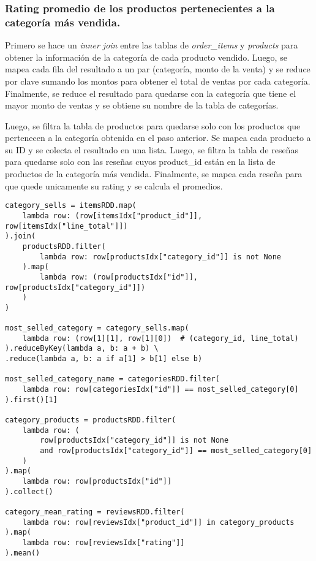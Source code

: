 \subsubsection{Rating promedio de los productos pertenecientes a la categoría más vendida.}

Primero se hace un \textit{inner join} entre las tablas de \textit{order\_items} y \textit{products} para obtener la información de la categoría de cada producto vendido. Luego, se mapea cada fila del resultado a un par (categoría, monto de la venta) y se reduce por clave sumando los montos para obtener el total de ventas por cada categoría. Finalmente, se reduce el resultado para quedarse con la categoría que tiene el mayor monto de ventas y se obtiene su nombre de la tabla de categorías.

Luego, se filtra la tabla de productos para quedarse solo con los productos que pertenecen a la categoría obtenida en el paso anterior. Se mapea cada producto a su ID y se colecta el resultado en una lista. Luego, se filtra la tabla de reseñas para quedarse solo con las reseñas cuyos product\_id están en la lista de productos de la categoría más vendida. Finalmente, se mapea cada reseña para que quede unicamente su rating y se calcula el promedios.



\begin{lstlisting}[caption={Resolución de la consulta 4 propuesta propia.}, xleftmargin=20pt, xrightmargin=20pt]
category_sells = itemsRDD.map(
    lambda row: (row[itemsIdx["product_id"]], row[itemsIdx["line_total"]])
).join(
    productsRDD.filter(
        lambda row: row[productsIdx["category_id"]] is not None
    ).map(
        lambda row: (row[productsIdx["id"]], row[productsIdx["category_id"]])
    )
)

most_selled_category = category_sells.map(
    lambda row: (row[1][1], row[1][0])  # (category_id, line_total)
).reduceByKey(lambda a, b: a + b) \
.reduce(lambda a, b: a if a[1] > b[1] else b)

most_selled_category_name = categoriesRDD.filter(
    lambda row: row[categoriesIdx["id"]] == most_selled_category[0]
).first()[1]

category_products = productsRDD.filter(
    lambda row: (
        row[productsIdx["category_id"]] is not None
        and row[productsIdx["category_id"]] == most_selled_category[0]
    )
).map(
    lambda row: row[productsIdx["id"]]
).collect()

category_mean_rating = reviewsRDD.filter(
    lambda row: row[reviewsIdx["product_id"]] in category_products
).map(
    lambda row: row[reviewsIdx["rating"]]
).mean()
\end{lstlisting}

